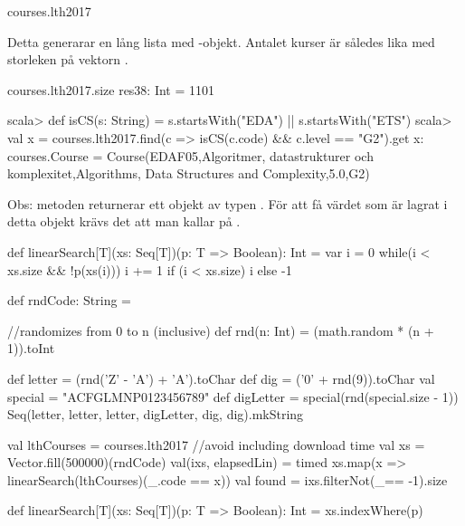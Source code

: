 \begin{REPLnonum}
courses.lth2017
\end{REPLnonum}
Detta generarar en lång lista med -objekt. Antalet kurser är således lika med storleken på vektorn .

\begin{REPLnonum}
courses.lth2017.size
res38: Int = 1101
\end{REPLnonum}

\SubtaskSolved
\begin{REPL}
scala> def isCS(s: String) = s.startsWith("EDA") || s.startsWith("ETS")
scala> val x = courses.lth2017.find(c => isCS(c.code) && c.level == "G2").get
x: courses.Course = Course(EDAF05,Algoritmer, datastrukturer och komplexitet,Algorithms, Data Structures and Complexity,5.0,G2)
\end{REPL}
Obs: metoden  returnerar ett objekt av typen . För att få värdet som är lagrat i detta objekt krävs det att man kallar på .

\SubtaskSolved
\begin{Code}
def linearSearch[T](xs: Seq[T])(p: T => Boolean): Int = {
   var i = 0
   while(i < xs.size && !p(xs(i))) i += 1
   if (i < xs.size) i else -1
}
\end{Code}

\SubtaskSolved

\begin{Code}[language=Scala]
def rndCode: String = {
   //randomizes from 0 to n (inclusive)
   def rnd(n: Int) = (math.random * (n + 1)).toInt

   def letter = (rnd('Z' - 'A') + 'A').toChar
   def dig = ('0' + rnd(9)).toChar
   val special = "ACFGLMNP0123456789"
   def digLetter = special(rnd(special.size - 1))
   Seq(letter, letter, letter, digLetter, dig, dig).mkString
}
\end{Code}

\SubtaskSolved

\begin{Code}
val lthCourses = courses.lth2017 //avoid including download time
val xs = Vector.fill(500000)(rndCode)
val(ixs, elapsedLin) = timed{
xs.map(x => linearSearch(lthCourses)(_.code == x))}
val found = ixs.filterNot(_== -1).size
\end{Code}

\SubtaskSolved

\begin{Code}
def linearSearch[T](xs: Seq[T])(p: T => Boolean): Int =
  xs.indexWhere(p)
\end{Code}



